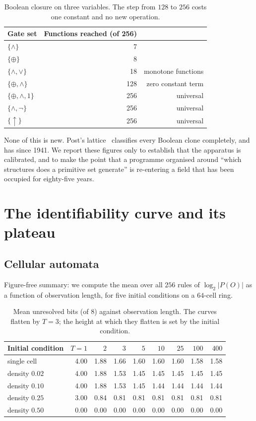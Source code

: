 \documentclass[11pt]{article}
\newcommand{\bits}{\ensuremath{\log_2|P(O)|}}
\begin{document}
\begin{table}[t]
\centering
\begin{tabular}{lrr}
\toprule
Gate set & Functions reached (of 256) & \\
\midrule
$\{\wedge\}$ & 7 & \\
$\{\oplus\}$ & 8 & \\
$\{\wedge,\vee\}$ & 18 & monotone functions \\
$\{\oplus,\wedge\}$ & 128 & zero constant term \\
$\{\oplus,\wedge,1\}$ & 256 & universal \\
$\{\wedge,\neg\}$ & 256 & universal \\
$\{\uparrow\}$ & 256 & universal \\
\bottomrule
\end{tabular}
\caption{Boolean closure on three variables. The step from $128$ to $256$ costs one
constant and no new operation.}
\end{table}

None of this is new. Post's lattice~\cite{post1941} classifies every Boolean clone
completely, and has since 1941. We report these figures only to establish that the
apparatus is calibrated, and to make the point that a programme organised around
``which structures does a primitive set generate'' is re-entering a field that has been
occupied for eighty-five years.

\section{The identifiability curve and its plateau}\label{sec:decomp}

\subsection{Cellular automata}

Figure-free summary: we compute the mean over all $256$ rules of $\bits$ as a function
of observation length, for five initial conditions on a $64$-cell ring.

\begin{table}[h]
\centering
\begin{tabular}{lrrrrrrrr}
\toprule
Initial condition & $T{=}1$ & $2$ & $3$ & $5$ & $10$ & $25$ & $100$ & $400$ \\
\midrule
single cell   & 4.00 & 1.88 & 1.66 & 1.60 & 1.60 & 1.60 & 1.58 & 1.58 \\
density $0.02$ & 4.00 & 1.88 & 1.53 & 1.45 & 1.45 & 1.45 & 1.45 & 1.45 \\
density $0.10$ & 4.00 & 1.88 & 1.53 & 1.45 & 1.44 & 1.44 & 1.44 & 1.44 \\
density $0.25$ & 3.00 & 0.84 & 0.81 & 0.81 & 0.81 & 0.81 & 0.81 & 0.81 \\
density $0.50$ & 0.00 & 0.00 & 0.00 & 0.00 & 0.00 & 0.00 & 0.00 & 0.00 \\
\bottomrule
\end{tabular}
\caption{Mean unresolved bits (of $8$) against observation length. The curves flatten
by $T=3$; the height at which they flatten is set by the initial condition.}
\label{tab:plateau}
\end{table}
\end{document}
